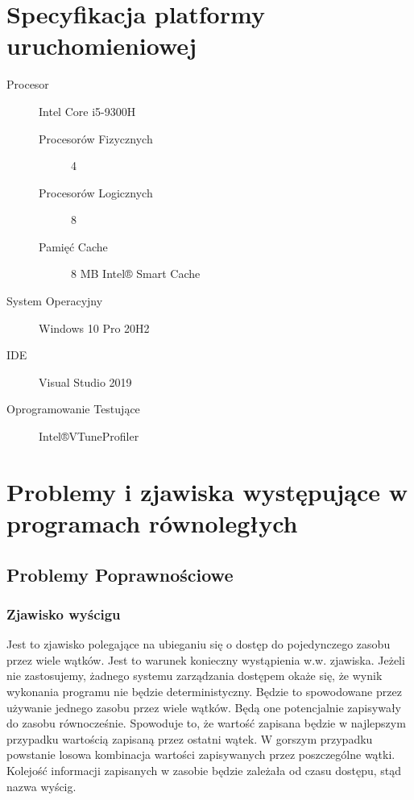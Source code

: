\documentclass{article}
\begin{document}
    \section{Specyfikacja platformy uruchomieniowej}
        \begin{addmargin}{3em}
            \begin{description}
                \item[Procesor] Intel Core i5-9300H
                    \begin{description}
                        \item[Procesorów Fizycznych] 4
                        \item[Procesorów Logicznych]  8
                        \item[Pamięć Cache]  8 MB Intel® Smart Cache 
                    \end{description} 
                \item[System Operacyjny] Windows 10 Pro 20H2
                \item[IDE] Visual Studio 2019
                \item[Oprogramowanie Testujące] Intel®VTune\texttrademark Profiler
            \end{description}
        \end{addmargin}
        
    \section{Problemy i zjawiska występujące w programach równoległych}
        \subsection{Problemy Poprawnościowe}
            \subsubsection{Zjawisko wyścigu}
                Jest to zjawisko polegające na ubieganiu się o dostęp do pojedynczego zasobu przez wiele wątków. Jest to warunek konieczny wystąpienia w.w. zjawiska. Jeżeli nie zastosujemy, żadnego systemu zarządzania dostępem okaże się, że wynik wykonania programu nie będzie deterministyczny. Będzie to spowodowane przez używanie jednego zasobu przez wiele wątków. Będą one potencjalnie zapisywały do zasobu równocześnie. Spowoduje to, że wartość zapisana będzie w najlepszym przypadku wartością zapisaną przez ostatni wątek. W gorszym przypadku powstanie losowa kombinacja wartości zapisywanych przez poszczególne wątki. Kolejość informacji zapisanych w zasobie będzie zależała od czasu dostępu, stąd nazwa wyścig.
                
\end{document}
